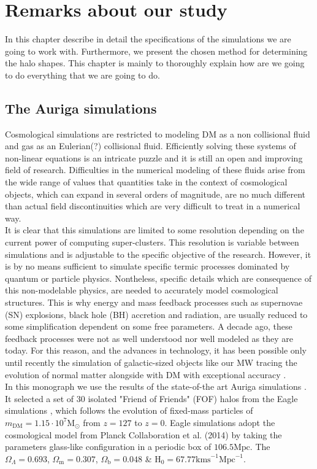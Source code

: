 \chapter{Remarks about our study}
In this chapter describe in detail the specifications of the simulations we are going to work with. Furthermore, we present the chosen method for determining the halo shapes. This chapter is mainly to thoroughly explain how are we going to do everything that we are going to do.\\

\section{The Auriga simulations}
Cosmological simulations are restricted to modeling DM as a non collisional fluid and gas as an Eulerian(?) collisional fluid. Efficiently solving these systems of non-linear equations is an intricate puzzle and it is still an open and improving field of research. 
Difficulties in the numerical modeling of these fluids arise from the wide range of values that quantities take in the context of cosmological objects, which can expand in several orders of magnitude, are no much different than actual field discontinuities which are very difficult to treat in a numerical way.\\

It is clear that this simulations are limited to some resolution depending on the current power of computing super-clusters. This resolution is variable between simulations and is adjustable to the specific objective of the research. However, it is by no means sufficient to simulate specific termic processes dominated by quantum or particle physics. Nontheless, specific details which are consequence of this non-modelable physics, are needed to accurately model cosmological structures. This is why energy and mass feedback processes such as supernovae (SN) explosions, black hole (BH) accretion and radiation, are usually reduced to some simplification dependent on some free parameters. A decade ago, these feedback processes were not as well understood nor well modeled as they are today. For this reason, and the advances in technology, it has been possible only until recently the simulation of galactic-sized objects like our MW tracing the evolution of normal matter alongside with DM with exceptional accuracy \cite{Auriga}.\\

In this monograph we use the results of the state-of-the art Auriga simulations \cite{Auriga}. It selected a set of 30 isolated "Friend of Friends" (FOF) \cite{FOF} halos from the Eagle simulations \cite{Eagle}, which follows the evolution of fixed-mass particles of $m_{\text{DM}} = 1.15\cdot 10^7\text{M}_{\odot}$ from $z=127$ to $z=0$. Eagle simulations adopt the cosmological model from Planck Collaboration et al. (2014) by taking the parameters 
glass-like configuration in a periodic box of $106.5\text{Mpc}$. The $\Omega_\Lambda=0.693$, $\Omega_\text{m}=0.307$, $\Omega_\text{b}=0.048$ \& $\text{H}_0=67.77\text{kms} ^{-1}\text{Mpc}^{-1}$.\\

